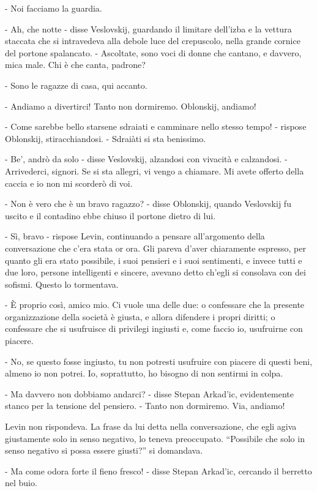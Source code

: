 - Noi facciamo la guardia. 

- Ah, che notte - disse Veslovskij, guardando il limitare dell'izba e la vettura staccata che si intravedeva alla debole luce del crepuscolo, nella grande cornice del portone spalancato. - Ascoltate, sono voci di donne che cantano, e davvero, mica male. Chi è che canta, padrone? 

- Sono le ragazze di casa, qui accanto. 

- Andiamo a divertirci! Tanto non dormiremo. Oblonskij, andiamo! 

- Come sarebbe bello starsene sdraiati e camminare nello stesso tempo! - rispose Oblonskij, stiracchiandosi. - Sdraiàti si sta benissimo. 

- Be', andrò da solo - disse Veslovskij, alzandosi con vivacità e calzandosi. - Arrivederci, signori. Se si sta allegri, vi vengo a chiamare. Mi avete offerto della caccia e io non mi scorderò di voi. 

- Non è vero che è un bravo ragazzo? - disse Oblonskij, quando Veslovskij fu uscito e il contadino ebbe chiuso il portone dietro di lui. 

- Sì, bravo - rispose Levin, continuando a pensare all'argomento della conversazione che c'era stata or ora. Gli pareva d'aver chiaramente espresso, per quanto gli era stato possibile, i suoi pensieri e i suoi sentimenti, e invece tutti e due loro, persone intelligenti e sincere, avevano detto ch'egli si consolava con dei sofismi. Questo lo tormentava. 

- È proprio così, amico mio. Ci vuole una delle due: o confessare che la presente organizzazione della società è giusta, e allora difendere i propri diritti; o confessare che si usufruisce di privilegi ingiusti e, come faccio io, usufruirne con piacere. 

- No, se questo fosse ingiusto, tu non potresti usufruire con piacere di questi beni, almeno io non potrei. Io, soprattutto, ho bisogno di non sentirmi in colpa. 

- Ma davvero non dobbiamo andarci? - disse Stepan Arkad'ic, evidentemente stanco per la tensione del pensiero. - Tanto non dormiremo. Via, andiamo! 

Levin non rispondeva. La frase da lui detta nella conversazione, che egli agiva giustamente solo in senso negativo, lo teneva preoccupato. ``Possibile che solo in senso negativo si possa essere giusti?'' si domandava. 

- Ma come odora forte il fieno fresco! - disse Stepan Arkad'ic, cercando il berretto nel buio. 


